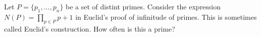   Let $P = \{p_1, ..., p_n\}$ be a set of distint primes.
  Consider the expression $N(P) = \prod_{p \in P} p + 1$ in Euclid's proof of infinitude of primes. 
  This is sometimes called Euclid's construction.
  How often is this a prime?
